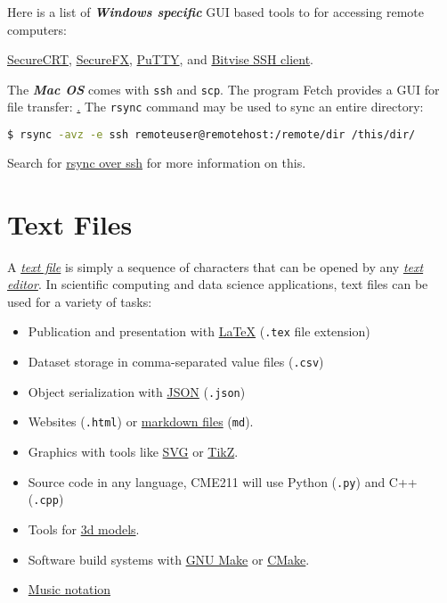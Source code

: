 \documentclass[12pt,letterpaper,twoside]{article}
\begin{document}
Here is a list of \textbf{\emph{Windows specific}} GUI based
tools to for accessing remote computers:

\href{https://uit.stanford.edu/software/securecrt}{SecureCRT},
\href{https://uit.stanford.edu/software/securefx}{SecureFX},
\href{http://www.chiark.greenend.org.uk/~sgtatham/putty/download.html}{PuTTY}, and
\href{https://www.bitvise.com/ssh-client}{Bitvise SSH client}.

The \textbf{\emph{Mac OS}} comes with \texttt{ssh} and \texttt{scp}.  The program Fetch provides a GUI for file
transfer: \href{https://uit.stanford.edu/software/fetch}.  The \texttt{rsync} command may
be used to sync an entire directory:

\begin{lstlisting}[language=bash]
$ rsync -avz -e ssh remoteuser@remotehost:/remote/dir /this/dir/
\end{lstlisting}

Search for \href{https://www.google.com/webhp?q=rsync%20over%20ssh#safe=off&q=rsync+over+ssh}{rsync over ssh} for more information on this.

\vspace{-8pt}
\section{Text Files}
\vspace{-8pt}

A \href{https://en.wikipedia.org/wiki/Text_file}{\emph{text file}}
is simply a sequence of characters that can be opened by any
\href{https://en.wikipedia.org/wiki/Text_editor}{\emph{text editor}}.  
In scientific computing and data science applications, text
files can be used for a variety of tasks:

\begin{multicols}{2}
\begin{itemize}
\item Publication and presentation with \href{https://www.latex-project.org/}{\LaTeX} (\texttt{.tex} file extension)
\item Dataset storage in comma-separated value files (\texttt{.csv})
\item Object serialization with \href{http://www.json.org/}{JSON} (\texttt{.json})
\item Websites (\texttt{.html}) or \href{http://daringfireball.net/projects/markdown/}{markdown files} (\texttt{md}).
\item Graphics with tools like \href{https://developer.mozilla.org/en-US/docs/Web/SVG}{SVG} or 
\href{http://www.texample.net/tikz/}{TikZ}.
\item Source code in any language, CME211 will use Python (\texttt{.py}) and C++ (\texttt{.cpp})
\item Tools for \href{http://www.implicitcad.org/}{3d models}.
\item Software build systems with \href{https://www.gnu.org/software/make/}{GNU Make} or \href{https://cmake.org/}{CMake}.
\item \href{http://lilypond.org/text-input.html}{Music notation}
\end{itemize}
\end{multicols}
\end{document}
